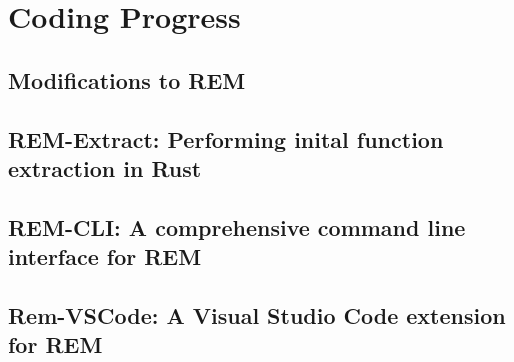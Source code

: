 \section{Coding Progress}

\subsection{Modifications to REM}

\subsection{REM-Extract: Performing inital function extraction in Rust}

\subsection{REM-CLI: A comprehensive command line interface for REM}

\subsection{Rem-VSCode: A Visual Studio Code extension for REM}
